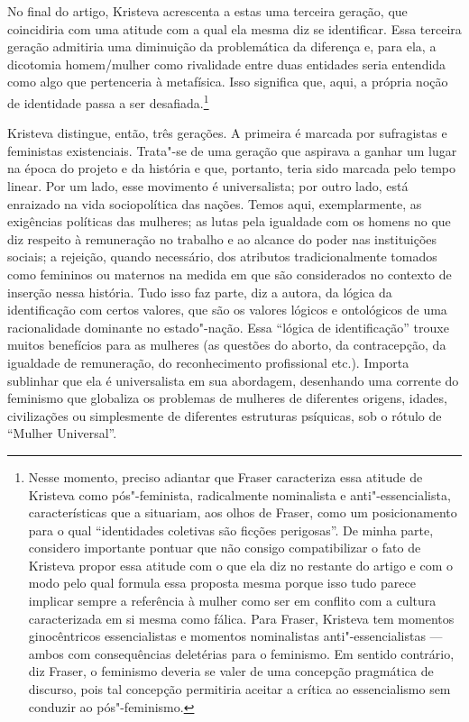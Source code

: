 No final do artigo, Kristeva acrescenta a estas uma terceira geração,
que coincidiria com uma atitude com a qual ela mesma diz se identificar.
Essa terceira geração admitiria uma diminuição da problemática da
diferença e, para ela, a dicotomia homem/mulher como rivalidade entre
duas entidades seria entendida como algo que pertenceria à metafísica.
Isso significa que, aqui, a própria noção de identidade passa a ser
desafiada.\footnote{Nesse momento, preciso adiantar que Fraser
  caracteriza essa atitude de Kristeva como pós"-feminista, radicalmente
  nominalista e anti"-essencialista, características que a situariam, aos
  olhos de Fraser, como um posicionamento para o qual ``identidades
  coletivas são ficções perigosas''. De minha parte, considero
  importante pontuar que não consigo compatibilizar o fato de Kristeva
  propor essa atitude com o que ela diz no restante do artigo e com o
  modo pelo qual formula essa proposta mesma porque isso tudo parece
  implicar sempre a referência à mulher como ser em conflito com a
  cultura caracterizada em si mesma como fálica. Para Fraser, Kristeva
  tem momentos ginocêntricos essencialistas e momentos nominalistas
  anti"-essencialistas --- ambos com consequências deletérias para o
  feminismo. Em sentido contrário, diz Fraser, o feminismo deveria se
  valer de uma concepção pragmática de discurso, pois tal concepção
  permitiria aceitar a crítica ao essencialismo sem conduzir ao
  pós"-feminismo.}

Kristeva distingue, então, três gerações. A primeira é marcada por
sufragistas e feministas existenciais. Trata"-se de uma geração que
aspirava a ganhar um lugar na época do projeto e da história e que,
portanto, teria sido marcada pelo tempo linear. Por um lado, esse
movimento é universalista; por outro lado, está enraizado na vida
sociopolítica das nações. Temos aqui, exemplarmente, as exigências
políticas das mulheres; as lutas pela igualdade com os homens no que diz
respeito à remuneração no trabalho e ao alcance do poder nas
instituições sociais; a rejeição, quando necessário, dos atributos
tradicionalmente tomados como femininos ou maternos na medida em que são
considerados no contexto de inserção nessa história. Tudo isso faz
parte, diz a autora, da lógica da identificação com certos valores, que
são os valores lógicos e ontológicos de uma racionalidade dominante no
estado"-nação. Essa ``lógica de identificação'' trouxe muitos benefícios
para as mulheres (as questões do aborto, da contracepção, da igualdade
de remuneração, do reconhecimento profissional etc.). Importa sublinhar
que ela é universalista em sua abordagem, desenhando uma corrente do
feminismo que globaliza os problemas de mulheres de diferentes origens,
idades, civilizações ou simplesmente de diferentes estruturas psíquicas,
sob o rótulo de ``Mulher Universal''.

